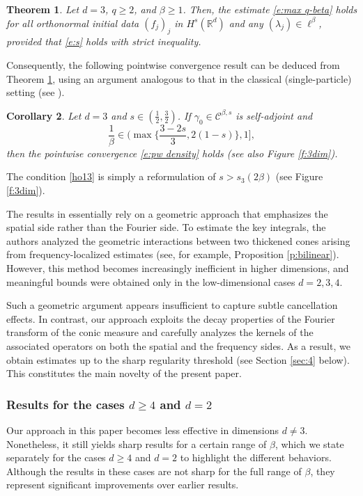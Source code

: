 \documentclass[a4paper]{amsart}
\numberwithin{figure}{section}
\numberwithin{equation}{section}%
\theoremstyle{plain}%
\newtheorem{theorem}{Theorem}[section]
\newtheorem{corollary}[theorem]{Corollary}
\theoremstyle{definition}
\theoremstyle{remark}%
\newcommand{\R}{{\mathbb R}}
\begin{document}
\begin{theorem}\label{t:max main3}
Let $d=3$, $q\geq2$, and $\beta\geq1$. Then, the estimate \eqref{e:max q-beta} 
holds for all orthonormal initial data $(f_j)_j$ in $H^s(\R^d)$ and any $(\lambda_j)\in \ell^\beta$, provided that \eqref{e:s} holds with strict inequality. 
\end{theorem}


Consequently, the following pointwise convergence result can be deduced from Theorem \ref{t:max main3}, using an argument analogous to that in the classical (single-particle) setting (see \cite{BLN_Selecta,BKS_TLMS}).
 
\begin{corollary}\label{t:pw main}
    Let $d=3$ and $s\in(\frac12,\frac 32)$. If $\gamma_0\in \mathcal C^{\beta,s}$ is self-adjoint  and 
    \begin{equation}\label{ho13} 
   \frac1\beta \in\Big( \max\Big\{\frac{3-2s}{3}, {2(1-s)}\Big\}, 1\Big],
    \end{equation}
     then the pointwise convergence \eqref{e:pw density} holds (see also Figure \ref{f:3dim}).
\end{corollary}

The condition \eqref{ho13} is simply a reformulation of $s>s_3(2\beta)$  (see Figure \ref{f:3dim}).  


The results in \cite{KKS} essentially rely on a geometric approach that emphasizes the spatial side rather than the Fourier side. To estimate the key integrals, the authors analyzed the geometric interactions between two thickened cones arising from frequency-localized estimates (see, for example, Proposition \ref{p:bilinear}). However, this method becomes increasingly inefficient in higher dimensions, and meaningful bounds were obtained only in the low-dimensional cases $d = 2, 3, 4$.



Such a geometric argument appears insufficient to capture subtle cancellation effects. In contrast, our approach exploits the decay properties of the Fourier transform of the conic measure and carefully analyzes the kernels of the associated operators on both the spatial and the frequency sides. As a result, we obtain estimates up to the sharp regularity threshold (see Section \ref{sec:4} below). This constitutes the main novelty of the present paper.








\subsubsection*{Results for  the cases $d \ge 4$ and $d = 2$} 
Our approach in this paper becomes less effective in dimensions $d \neq 3$. Nonetheless, it still yields sharp results for a certain range of $\beta$, which we state separately for the cases $d \ge 4$ and $d = 2$ to highlight the different behaviors. Although the results in these cases are not sharp for the full range of $\beta$, they represent significant improvements over earlier results.
\end{document}
